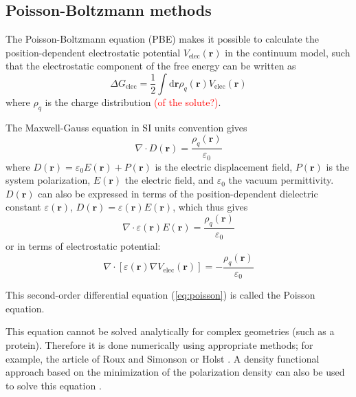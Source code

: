\subsection{Poisson-Boltzmann methods\label{subsec:Poisson=002013Boltzmann-methods}}

The Poisson-Boltzmann equation (PBE) \citep{holst_1994_poisson} makes
it possible to calculate the position-dependent electrostatic potential
$V_{\mathrm{elec}}(\mathbf{r})$ in the continuum model, such that
the electrostatic component of the free energy can be written as
\begin{equation}
\Delta G_{\mathrm{elec}}=\frac{1}{2}\int\mathrm{d}\mathbf{r}\rho_{q}(\mathbf{r})V_{\mathrm{elec}}(\mathbf{r})
\end{equation}
where $\rho_{q}$ is the charge distribution \textcolor{red}{(of the
solute?)}.

The Maxwell-Gauss equation in SI units convention gives
\begin{equation}
\nabla\cdot D(\mathbf{r})=\dfrac{\rho_{q}(\mathbf{r})}{\varepsilon_{0}}
\end{equation}
where $D(\mathbf{r})=\varepsilon_{0}E(\mathbf{r})+P(\mathbf{r})$
is the electric displacement field, $P(\mathbf{r})$ is the system
polarization, $E(\mathbf{r})$ the electric field, and $\varepsilon_{0}$
the vacuum permittivity. $D(\mathbf{r})$ can also be expressed in
terms of the position-dependent dielectric constant $\varepsilon(\mathbf{r})$,
$D(\mathbf{r})=\varepsilon(\mathbf{r})E(\mathbf{r})$, which thus
gives
\begin{equation}
\nabla\cdot\varepsilon(\mathbf{r})E(\mathbf{r})=\dfrac{\rho_{q}(\mathbf{r})}{\varepsilon_{0}}
\end{equation}
or in terms of electrostatic potential:
\begin{equation}
\nabla\cdot\left[\varepsilon(\mathbf{r})\nabla V_{\mathrm{elec}}(\mathbf{r})\right]=-\dfrac{\rho_{q}(\mathbf{r})}{\varepsilon_{0}}\label{eq:poisson}
\end{equation}

This second-order differential equation (\ref{eq:poisson}) is called
the Poisson equation. 

This equation cannot be solved analytically for complex geometries
(such as a protein). Therefore it is done numerically using appropriate
methods; for example, the article of
Roux and Simonson \citep{roux_implicit_1999} or Holst \citep{holst_1994_poisson}.
A density functional approach based on the minimization of the polarization
density can also be used to solve this equation \citep{Marchi_2001,Levy_2005}.

